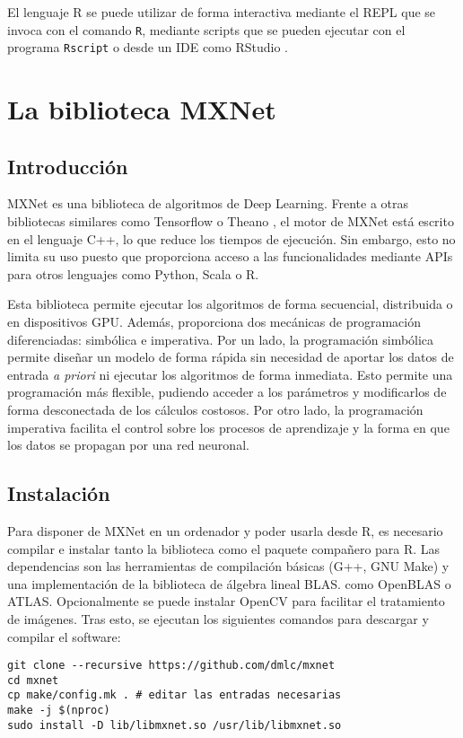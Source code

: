 El lenguaje R se puede utilizar de forma interactiva mediante el REPL que se invoca con el comando \texttt{R}, mediante scripts que se pueden ejecutar con el programa \texttt{Rscript} o desde un IDE como RStudio \autocite{rstudio}.

\section{La biblioteca MXNet}\label{sec:mxnet}
\subsection{Introducción}
MXNet \autocite{mxnet} es una biblioteca de algoritmos de Deep Learning. Frente a otras bibliotecas similares como Tensorflow \autocite{tensorflow} o Theano \autocite{theano}, el motor de MXNet está escrito en el lenguaje C++, lo que reduce los tiempos de ejecución. Sin embargo, esto no limita su uso puesto que proporciona acceso a las funcionalidades mediante APIs para otros lenguajes como Python, Scala o R.

Esta biblioteca permite ejecutar los algoritmos de forma secuencial, distribuida o en dispositivos GPU. Además, proporciona dos mecánicas de programación diferenciadas: simbólica e imperativa. Por un lado, la programación simbólica permite diseñar un modelo de forma rápida sin necesidad de aportar los datos de entrada \textit{a priori} ni ejecutar los algoritmos de forma inmediata. Esto permite una programación más flexible, pudiendo acceder a los parámetros y modificarlos de forma desconectada de los cálculos costosos. Por otro lado, la programación imperativa facilita el control sobre los procesos de aprendizaje y la forma en que los datos se propagan por una red neuronal.

\subsection{Instalación}

Para disponer de MXNet en un ordenador y poder usarla desde R, es necesario compilar e instalar tanto la biblioteca como el paquete compañero para R. Las dependencias son las herramientas de compilación básicas (G++, GNU Make) y una implementación de la biblioteca de álgebra lineal BLAS. como OpenBLAS o ATLAS. Opcionalmente se puede instalar OpenCV para facilitar el tratamiento de imágenes. Tras esto, se ejecutan los siguientes comandos para descargar y compilar el software:

\begin{verbatim}
git clone --recursive https://github.com/dmlc/mxnet
cd mxnet
cp make/config.mk . # editar las entradas necesarias
make -j $(nproc)
sudo install -D lib/libmxnet.so /usr/lib/libmxnet.so
\end{verbatim}

